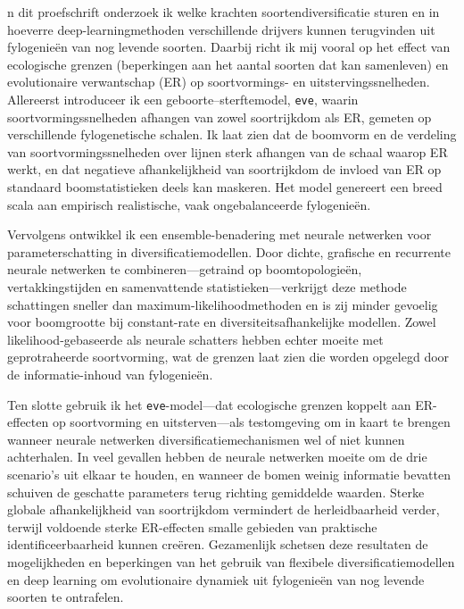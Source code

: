 {

n dit proefschrift onderzoek ik welke krachten soorten\-diversificatie sturen en in hoeverre deep-learningmethoden verschillende drijvers kunnen terugvinden uit fylogenieën van nog levende soorten. Daarbij richt ik mij vooral op het effect van ecologische grenzen (beperkingen aan het aantal soorten dat kan samenleven) en evolutionaire verwantschap (ER) op soortvormings- en uitstervingssnelheden.
Allereerst introduceer ik een geboorte--sterftemodel, \texttt{eve}, waarin soortvormingssnelheden afhangen van zowel soortrijkdom als ER, gemeten op verschillende fylogenetische schalen.
Ik laat zien dat de boomvorm en de verdeling van soortvormingssnelheden over lijnen sterk afhangen van de schaal waarop ER werkt, en dat negatieve afhankelijkheid van soortrijkdom de invloed van ER op standaard boomstatistieken deels kan maskeren. Het model genereert een breed scala aan empirisch realistische, vaak ongebalanceerde fylogenieën.

Vervolgens ontwikkel ik een ensemble-benadering met neurale netwerken voor parameterschatting in diversificatiemodellen.
Door dichte, grafische en recurrente neurale netwerken te combineren---getraind op boomtopologieën, vertakkingstijden en samenvattende statistieken---verkrijgt deze methode schattingen sneller dan maximum-likelihoodmethoden en is zij minder gevoelig voor boomgrootte bij constant-rate en diversiteitsafhankelijke modellen. Zowel likelihood-gebaseerde als neurale schatters hebben echter moeite met geprotraheerde soortvorming, wat de grenzen laat zien die worden opgelegd door de informatie-inhoud van fylogenieën.

Ten slotte gebruik ik het \texttt{eve}-model---dat ecologische grenzen koppelt aan ER-effecten op soortvorming en uitsterven---als testomgeving om in kaart te brengen wanneer neurale netwerken diversificatiemechanismen wel of niet kunnen achterhalen.
In veel gevallen hebben de neurale netwerken moeite om de drie scenario's uit elkaar te houden, en wanneer de bomen weinig informatie bevatten schuiven de geschatte parameters terug richting gemiddelde waarden. Sterke globale afhankelijkheid van soortrijkdom vermindert de herleidbaarheid verder, terwijl voldoende sterke ER-effecten smalle gebieden van praktische identificeerbaarheid kunnen creëren. Gezamenlijk schetsen deze resultaten de mogelijkheden en beperkingen van het gebruik van flexibele diversificatiemodellen en deep learning om evolutionaire dynamiek uit fylogenieën van nog levende soorten te ontrafelen.

}


